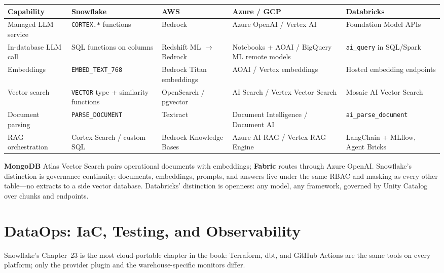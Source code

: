 \begin{center}
\footnotesize
\begin{tabular}{@{}p{2.5cm}p{2.9cm}p{2.7cm}p{2.9cm}p{2.9cm}@{}}
\toprule
\textbf{Capability} & \textbf{Snowflake} & \textbf{AWS} & \textbf{Azure / GCP} & \textbf{Databricks} \\
\midrule
Managed LLM service & \texttt{CORTEX.*} functions & Bedrock & Azure OpenAI / Vertex AI & Foundation Model APIs \\
In-database LLM call & SQL functions on columns & Redshift ML $\rightarrow$ Bedrock & Notebooks + AOAI / BigQuery ML remote models & \texttt{ai\_query} in SQL/Spark \\
Embeddings & \texttt{EMBED\_TEXT\_768} & Bedrock Titan embeddings & AOAI / Vertex embeddings & Hosted embedding endpoints \\
Vector search & \texttt{VECTOR} type + similarity functions & OpenSearch / pgvector & AI Search / Vertex Vector Search & Mosaic AI Vector Search \\
Document parsing & \texttt{PARSE\_DOCUMENT} & Textract & Document Intelligence / Document AI & \texttt{ai\_parse\_document} \\
RAG orchestration & Cortex Search / custom SQL & Bedrock Knowledge Bases & Azure AI RAG / Vertex RAG Engine & LangChain + MLflow, Agent Bricks \\
\bottomrule
\end{tabular}
\end{center}

\noindent \textbf{MongoDB} Atlas Vector Search pairs operational documents with embeddings;
\textbf{Fabric} routes through Azure OpenAI. Snowflake's distinction is governance continuity:
documents, embeddings, prompts, and answers live under the same RBAC and masking as every other
table---no extracts to a side vector database. Databricks' distinction is openness: any model,
any framework, governed by Unity Catalog over chunks and endpoints.

\section{DataOps: IaC, Testing, and Observability}
%
Snowflake's Chapter~23 is the most cloud-portable chapter in the book: Terraform, dbt, and
GitHub Actions are the same tools on every platform; only the provider plugin and the
warehouse-specific monitors differ.

